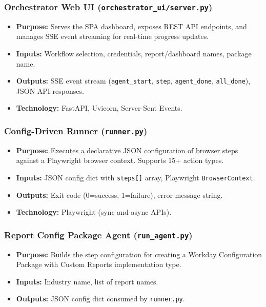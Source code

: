 \documentclass[12pt,a4paper]{article}
\begin{document}
\subsubsection{Orchestrator Web UI (\texttt{orchestrator\_ui/server.py})}
\begin{itemize}[leftmargin=2em]
  \item \textbf{Purpose:} Serves the SPA dashboard, exposes REST API endpoints, and manages SSE event streaming for real-time progress updates.
  \item \textbf{Inputs:} Workflow selection, credentials, report/dashboard names, package name.
  \item \textbf{Outputs:} SSE event stream (\texttt{agent\_start}, \texttt{step}, \texttt{agent\_done}, \texttt{all\_done}), JSON API responses.
  \item \textbf{Technology:} FastAPI, Uvicorn, Server-Sent Events.
\end{itemize}

\subsubsection{Config-Driven Runner (\texttt{runner.py})}
\begin{itemize}[leftmargin=2em]
  \item \textbf{Purpose:} Executes a declarative JSON configuration of browser steps against a Playwright browser context. Supports 15+ action types.
  \item \textbf{Inputs:} JSON config dict with \texttt{steps[]} array, Playwright \texttt{BrowserContext}.
  \item \textbf{Outputs:} Exit code (0=success, 1=failure), error message string.
  \item \textbf{Technology:} Playwright (sync and async APIs).
\end{itemize}

\subsubsection{Report Config Package Agent (\texttt{run\_agent.py})}
\begin{itemize}[leftmargin=2em]
  \item \textbf{Purpose:} Builds the step configuration for creating a Workday Configuration Package with Custom Reports implementation type.
  \item \textbf{Inputs:} Industry name, list of report names.
  \item \textbf{Outputs:} JSON config dict consumed by \texttt{runner.py}.
\end{itemize}
\end{document}

